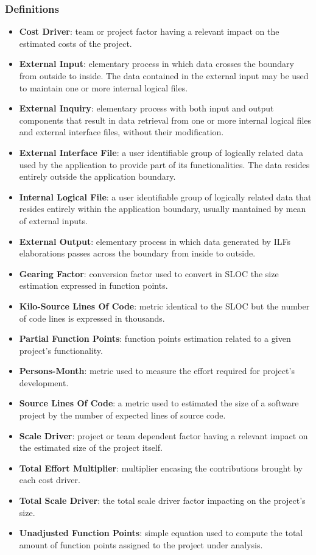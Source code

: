 \subsubsection{Definitions}

\begin{itemize}
	\item \textbf{Cost Driver}: team or project factor having a relevant impact on the estimated costs of the project.
        \item \textbf{External Input}: elementary process in which data crosses the boundary from outside to inside. The data contained in the external input may be used to maintain one or more internal logical files.
        \item \textbf{External Inquiry}: elementary process with both input and output components that result in data retrieval from one or more internal logical files and external interface files, without their modification.
        \item \textbf{External Interface File}: a user identifiable group of logically related data used by the application to provide part of its functionalities. The data resides entirely outside the application boundary.
        \item \textbf{Internal Logical File}: a user identifiable group of logically related data that resides entirely within the application boundary, usually mantained by mean of external inputs.
        \item \textbf{External Output}: elementary process in which data generated by ILFs elaborations passes across the boundary from inside to outside.
	\item \textbf{Gearing Factor}: conversion factor used to convert in SLOC the size estimation expressed in function points.
	\item \textbf{Kilo-Source Lines Of Code}: metric identical to the SLOC but the number of code lines is expressed in thousands.
	\item \textbf{Partial Function Points}: function points estimation related to a given project's functionality.
	\item \textbf{Persons-Month}: metric used to measure the effort required for project's development. 
	\item \textbf{Source Lines Of Code}: a metric used to estimated the size of a software project by the number of expected lines of source code.
	\item \textbf{Scale Driver}: project or team dependent factor having a relevant impact on the estimated size of the project itself.
	\item \textbf{Total Effort Multiplier}: multiplier encasing the contributions brought by each cost driver.
	\item \textbf{Total Scale Driver}: the total scale driver factor impacting on the project's size.
	\item \textbf{Unadjusted Function Points}: simple equation used to compute the total amount of function points assigned to the project under analysis.
\end{itemize}
